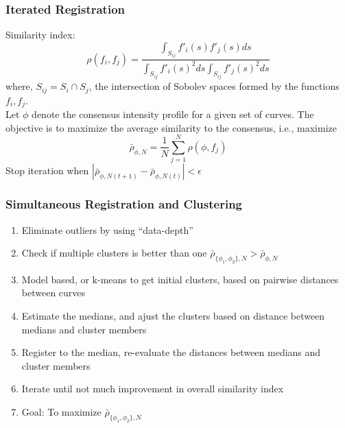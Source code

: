 \documentclass[10pt,dvipsnames,table]{beamer}
\begin{document}
\begin{frame}
\frametitle{Iterated Registration}
Similarity index:
\[ \rho(f_i, f_j) = \frac{\int _{S_{ij}}f'_i(s)f'_j(s) ds}{\int _{S_{ij}}f'_i(s)^2 ds \int _{S_{ij}}f'_j(s)^2 ds} \]
where, $S_{ij} = S_i \cap S_j$, the intersection of Sobolev spaces formed by the functions $f_i, f_j$.\\

Let $\phi$ denote the consensus intensity profile for a given set of curves. The objective is to maximize the average similarity to the consensus, i.e., maximize
\[ \bar{\rho}_{\phi, N} = \frac{1}{N} \sum \limits_{j = 1}^{N} \rho(\phi, f_j)\]
Stop iteration when $|\bar{\rho}_{\phi, N (t+1)} - \bar{\rho}_{\phi, N (t)} | < \epsilon$
\end{frame}


\begin{frame}
\frametitle{Simultaneous Registration and Clustering}
\begin{enumerate}
\item Eliminate outliers by using ``data-depth''
\item Check if multiple clusters is better than one $\bar{\rho}_{\{\phi_1, \phi_2\}, N} > \bar{\rho}_{\phi, N}$
\item Model based, or k-means to get initial clusters, based on pairwise distances between curves
\item Estimate the medians, and ajust the clusters based on distance between medians and cluster members
\item Register to the median, re-evaluate the distances between medians and cluster members
\item Iterate until not much improvement in overall similarity index
\item Goal: To maximize $\bar{\rho}_{\{\phi_1, \phi_2\}, N}$
\end{enumerate}
\end{frame}
\end{document}
